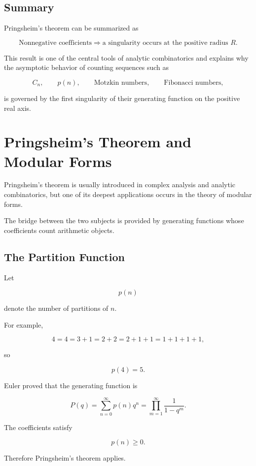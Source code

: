 \documentclass[12pt,a4paper]{article}
\theoremstyle{notespace}
\begin{document}
\bigskip

\subsection{Summary}

Pringsheim's theorem can be summarized as

\[
\boxed{
	\text{Nonnegative coefficients}
	\Longrightarrow
	\text{a singularity occurs at the positive radius } R.
}
\]

This result is one of the central tools of analytic combinatorics and explains why the asymptotic behavior of counting sequences such as

\[
C_n,\qquad p(n),\qquad
\text{Motzkin numbers},\qquad
\text{Fibonacci numbers},
\]

is governed by the first singularity of their generating function on the positive real axis.

\section{Pringsheim's Theorem and Modular Forms}

Pringsheim's theorem is usually introduced in complex analysis and analytic combinatorics, but one of its deepest applications occurs in the theory of modular forms.

The bridge between the two subjects is provided by generating functions whose coefficients count arithmetic objects.

\bigskip

\subsection{The Partition Function}

Let

\[
p(n)
\]

denote the number of partitions of \(n\).

For example,

\[
4=4=3+1=2+2=2+1+1=1+1+1+1,
\]

so

\[
p(4)=5.
\]

Euler proved that the generating function is

\[
P(q)
=
\sum_{n=0}^{\infty}
p(n)q^n
=
\prod_{m=1}^{\infty}
\frac{1}{1-q^m}.
\]

The coefficients satisfy

\[
p(n)\ge0.
\]

Therefore Pringsheim's theorem applies.
\end{document}
